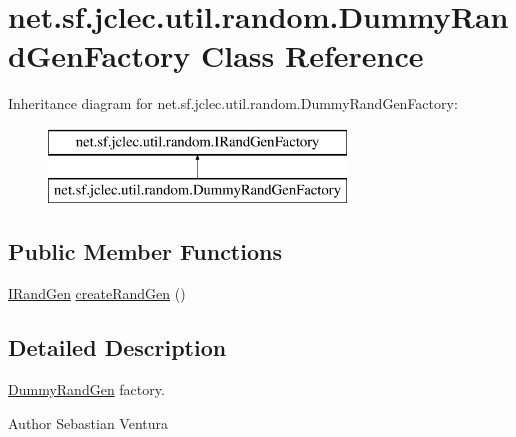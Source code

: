 \hypertarget{classnet_1_1sf_1_1jclec_1_1util_1_1random_1_1_dummy_rand_gen_factory}{\section{net.\-sf.\-jclec.\-util.\-random.\-Dummy\-Rand\-Gen\-Factory Class Reference}
\label{classnet_1_1sf_1_1jclec_1_1util_1_1random_1_1_dummy_rand_gen_factory}
}
Inheritance diagram for net.\-sf.\-jclec.\-util.\-random.\-Dummy\-Rand\-Gen\-Factory\-:\begin{figure}[H]
\begin{center}
\leavevmode
\includegraphics[height=2.000000cm]{classnet_1_1sf_1_1jclec_1_1util_1_1random_1_1_dummy_rand_gen_factory}
\end{center}
\end{figure}
\subsection*{Public Member Functions}
\begin{DoxyCompactItemize}
\item 
\hyperlink{interfacenet_1_1sf_1_1jclec_1_1util_1_1random_1_1_i_rand_gen}{I\-Rand\-Gen} \hyperlink{classnet_1_1sf_1_1jclec_1_1util_1_1random_1_1_dummy_rand_gen_factory_a3adb6be068a37e8ec08b9365f6417c85}{create\-Rand\-Gen} ()
\end{DoxyCompactItemize}


\subsection{Detailed Description}
\hyperlink{classnet_1_1sf_1_1jclec_1_1util_1_1random_1_1_dummy_rand_gen}{Dummy\-Rand\-Gen} factory.

\begin{DoxyAuthor}{Author}
Sebastian Ventura 
\end{DoxyAuthor}


